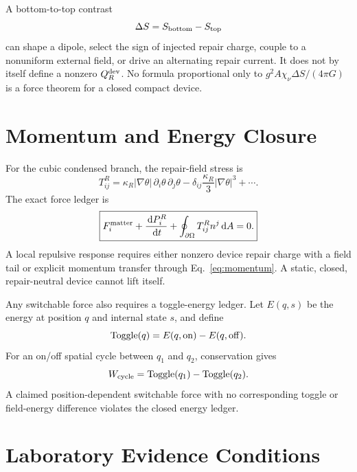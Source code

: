 \documentclass[11pt]{article}
\numberwithin{equation}{section}
\theoremstyle{remark}
\newcommand{\chinu}{\chi_\nu}
\newcommand{\dd}{\,\mathrm d}
\begin{document}
A bottom-to-top contrast
\begin{equation}
\Delta S=S_{\rm bottom}-S_{\rm top}
\end{equation}
can shape a dipole, select the sign of injected repair charge, couple to a
nonuniform external field, or drive an alternating repair current. It does not
by itself define a nonzero \(Q_R^{\rm dev}\). No formula proportional only to
\(g^2A\chinu\Delta S/(4\pi G)\) is a force theorem for a closed compact
device.

\section{Momentum and Energy Closure}

For the cubic condensed branch, the repair-field stress is
\begin{equation}
T^R_{ij}=\kappa_R|\nabla\theta|\,
\partial_i\theta\,\partial_j\theta
-\delta_{ij}\frac{\kappa_R}{3}|\nabla\theta|^3+\cdots .
\label{eq:stress}
\end{equation}
The exact force ledger is
\begin{equation}
\boxed{
F_i^{\rm matter}+\frac{\dd P_i^R}{\dd t}
+\oint_{\partial\Omega}T^R_{ij}n^j\dd A=0.}
\label{eq:momentum}
\end{equation}
A local repulsive response requires either nonzero device repair charge with a
field tail or explicit momentum transfer through
Eq.~\eqref{eq:momentum}. A static, closed, repair-neutral device cannot lift
itself.

Any switchable force also requires a toggle-energy ledger. Let \(E(q,s)\) be
the energy at position \(q\) and internal state \(s\), and define
\begin{equation}
\operatorname{Toggle}(q)=E(q,{\rm on})-E(q,{\rm off}).
\end{equation}
For an on/off spatial cycle between \(q_1\) and \(q_2\), conservation gives
\begin{equation}
W_{\rm cycle}=\operatorname{Toggle}(q_1)
-\operatorname{Toggle}(q_2).
\end{equation}
A claimed position-dependent switchable force with no corresponding toggle or
field-energy difference violates the closed energy ledger.

\section{Laboratory Evidence Conditions}
\end{document}
